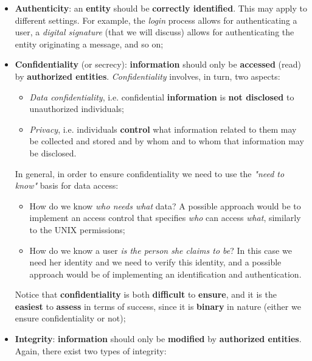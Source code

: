 \begin{itemize}
    \item \textbf{Authenticity}: an \textbf{entity} should be \textbf{correctly identified}. This may apply to different settings. For example, the \textit{login} process allows for authenticating a user, a \textit{digital signature} (that we will discuss) allows for authenticating the entity originating a message, and so on;
    \item \textbf{Confidentiality} (or secrecy): \textbf{information} should only be \textbf{accessed} (read) by \textbf{authorized entities}. \textit{Confidentiality} involves, in turn, two aspects:

    \begin{itemize}
        \item \textit{Data confidentiality}, i.e. confidential \textbf{information} is \textbf{not disclosed} to unauthorized individuals;
        \item \textit{Privacy}, i.e. individuals \textbf{control} what information related to them may be collected and stored and by whom and to whom that information may be disclosed.
    \end{itemize}

    In general, in order to ensure confidentiality we need to use the \textit{"need to know"} basis for data access:

    \begin{itemize}
        \item How do we know \textit{who needs what} data? A possible approach would be to implement an access control that specifies \textit{who} can access \textit{what}, similarly to the UNIX permissions;
        \item How do we know a user \textit{is the person she claims to be}? In this case we need her identity and we need to verify this identity, and a possible approach would be of implementing an identification and authentication.
    \end{itemize}

    Notice that \textbf{confidentiality} is both \textbf{difficult} to \textbf{ensure}, and it is the \textbf{easiest} to \textbf{assess} in terms of success, since it is \textbf{binary} in nature (either we ensure confidentiality or not);
    
    \item \textbf{Integrity}: \textbf{information} should only be \textbf{modified} by \textbf{authorized entities}. Again, there exist two types of integrity:


\end{itemize}
